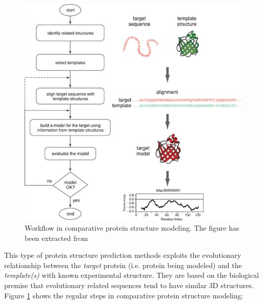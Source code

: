 \documentclass[12pt, a4paper,twoside]{tesi_upf}
\begin{document}
\begin{figure}[htb!]

  \centering
  	\includegraphics[scale=1]{../figures/workflow.jpg} %

	\caption{Workflow in comparative protein structure modeling.  The figure has been extracted from \cite{Eswar2007}}
	\label{fig:workflow_modeling}
\end{figure}
\par This type of protein structure prediction methods exploits the evolutionary relationship between the \textit{target} protein (i.e. protein being modeled) and the \textit{template(s)} with known experimental structure. They are based on the biological premise that evolutionary related sequences tend to have similar 3D structures. Figure \ref{fig:workflow_modeling} shows the regular steps in comparative protein structure modeling: 
\end{document}
